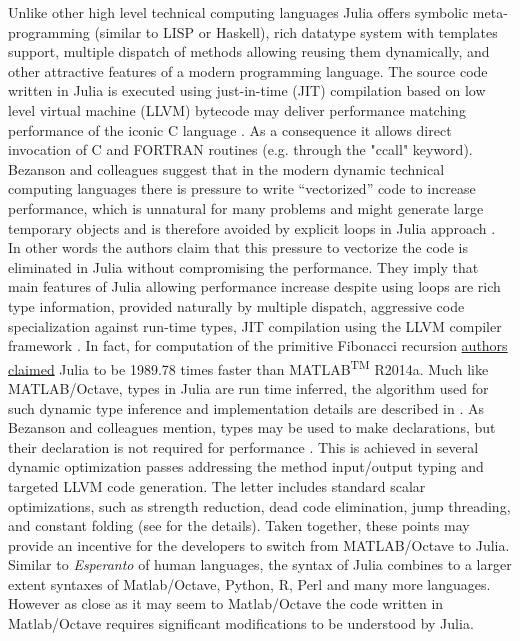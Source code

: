 Unlike other high level technical computing languages Julia offers symbolic meta-programming (similar to LISP or Haskell), rich datatype system with templates support, multiple dispatch of methods allowing reusing them dynamically, and other attractive features of a modern programming language. The source code written in Julia is executed using just-in-time (JIT) compilation based on low level virtual machine (LLVM) \cite{Lattner_2004} bytecode may deliver performance matching performance of the iconic C language \cite{bezanson2012julia, bezanson2014julia}. As a consequence it allows direct invocation of C and FORTRAN routines (e.g. through the "ccall" keyword). Bezanson and colleagues suggest that in the modern dynamic technical computing languages there is pressure to write “vectorized” code to increase performance, which is unnatural for many problems and might generate large temporary objects and is therefore avoided by explicit loops in Julia approach \cite{bezanson2012julia}. In other words the authors claim that this pressure to vectorize the code is eliminated in Julia without compromising the performance. They imply that main features of Julia allowing performance increase despite using loops are rich type information, provided naturally by multiple dispatch, aggressive code specialization against run-time types, JIT compilation using the LLVM compiler framework \cite{bezanson2012julia, Lattner_2004}. In fact, for computation of the primitive Fibonacci recursion \href{http://julialang.org/benchmarks/}{authors claimed} Julia to be 1989.78 times faster than MATLAB\textsuperscript{TM} R2014a. Much like MATLAB/Octave, types in Julia are run time inferred, the algorithm used for such dynamic type inference and implementation details are described in \cite{Kaplan_1980, bezanson2012julia}. As Bezanson and colleagues mention, types may be used to make declarations, but their declaration is not required for performance \cite{bezanson2012julia}. This is achieved in several dynamic optimization passes addressing the method input/output typing and targeted LLVM code generation. The letter includes standard scalar optimizations, such as strength reduction, dead code elimination, jump threading, and constant folding (see \cite{bezanson2012julia} for the details). Taken together, these points may provide an incentive for the developers to switch from MATLAB/Octave to Julia. Similar to \textit{Esperanto} of human languages, the syntax of Julia combines to a larger extent syntaxes of Matlab/Octave, Python, R, Perl and many more languages. However as close as it may seem to Matlab/Octave the code written in Matlab/Octave requires significant modifications to be understood by Julia.

